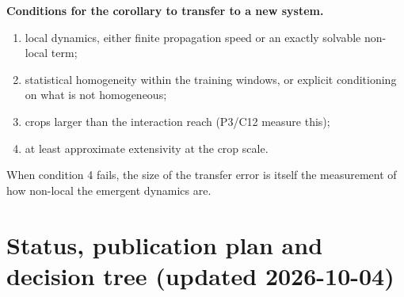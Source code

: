 \documentclass[11pt]{article}
\begin{document}
\textbf{Conditions for the corollary to transfer to a new system.}
\begin{enumerate}[leftmargin=*]
\item local dynamics, either finite propagation speed or an exactly
  solvable non-local term;
\item statistical homogeneity within the training windows, or explicit
  conditioning on what is not homogeneous;
\item crops larger than the interaction reach (P3/C12 measure this);
\item at least approximate extensivity at the crop scale.
\end{enumerate}
When condition 4 fails, the size of the transfer error is itself the
measurement of how non-local the emergent dynamics are.

\section{Status, publication plan and decision tree (updated 2026-10-04)}
\label{sec:status_plan}
\end{document}
